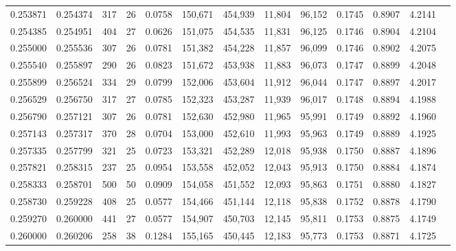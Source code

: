 \begin{tabular}{rrrrrrrrrrrrr}
0.253871 & 0.254374 &    317 &    26 &                                     0.0758 & 150,671 & 454,939 &  11,804 &  96,152 & 0.1745 & 0.8907 & 4.2141 \\
0.254385 & 0.254951 &    404 &    27 &                                     0.0626 & 151,075 & 454,535 &  11,831 &  96,125 & 0.1746 & 0.8904 & 4.2104 \\
0.255000 & 0.255536 &    307 &    26 &                                     0.0781 & 151,382 & 454,228 &  11,857 &  96,099 & 0.1746 & 0.8902 & 4.2075 \\
0.255540 & 0.255897 &    290 &    26 &                                     0.0823 & 151,672 & 453,938 &  11,883 &  96,073 & 0.1747 & 0.8899 & 4.2048 \\
0.255899 & 0.256524 &    334 &    29 &                                     0.0799 & 152,006 & 453,604 &  11,912 &  96,044 & 0.1747 & 0.8897 & 4.2017 \\
0.256529 & 0.256750 &    317 &    27 &                                     0.0785 & 152,323 & 453,287 &  11,939 &  96,017 & 0.1748 & 0.8894 & 4.1988 \\
0.256790 & 0.257121 &    307 &    26 &                                     0.0781 & 152,630 & 452,980 &  11,965 &  95,991 & 0.1749 & 0.8892 & 4.1960 \\
0.257143 & 0.257317 &    370 &    28 &                                     0.0704 & 153,000 & 452,610 &  11,993 &  95,963 & 0.1749 & 0.8889 & 4.1925 \\
0.257335 & 0.257799 &    321 &    25 &                                     0.0723 & 153,321 & 452,289 &  12,018 &  95,938 & 0.1750 & 0.8887 & 4.1896 \\
0.257821 & 0.258315 &    237 &    25 &                                     0.0954 & 153,558 & 452,052 &  12,043 &  95,913 & 0.1750 & 0.8884 & 4.1874 \\
0.258333 & 0.258701 &    500 &    50 &                                     0.0909 & 154,058 & 451,552 &  12,093 &  95,863 & 0.1751 & 0.8880 & 4.1827 \\
0.258730 & 0.259228 &    408 &    25 &                                     0.0577 & 154,466 & 451,144 &  12,118 &  95,838 & 0.1752 & 0.8878 & 4.1790 \\
0.259270 & 0.260000 &    441 &    27 &                                     0.0577 & 154,907 & 450,703 &  12,145 &  95,811 & 0.1753 & 0.8875 & 4.1749 \\
0.260000 & 0.260206 &    258 &    38 &                                     0.1284 & 155,165 & 450,445 &  12,183 &  95,773 & 0.1753 & 0.8871 & 4.1725 \\

\end{tabular}
